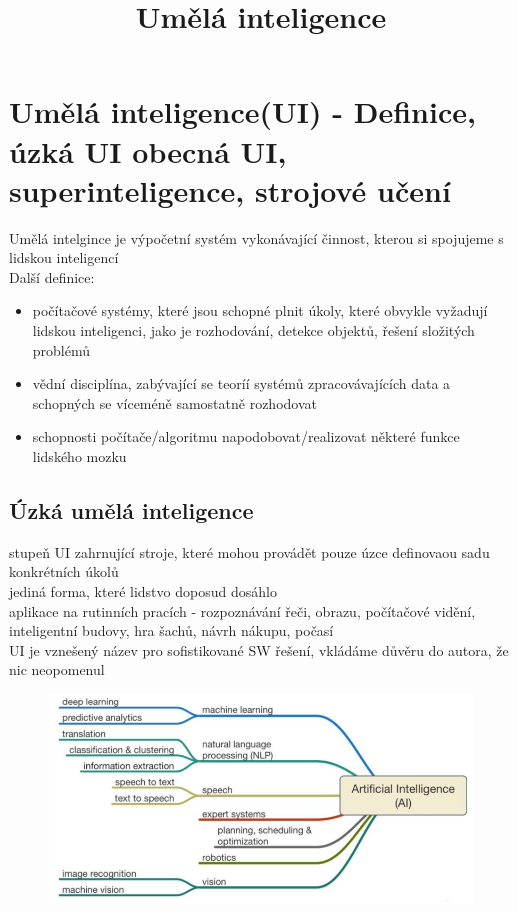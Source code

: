 \title{Umělá inteligence}

\section{Umělá inteligence(UI) - Definice, úzká UI obecná UI, superinteligence, strojové učení}
Umělá intelgince je výpočetní systém vykonávající činnost, kterou si spojujeme s lidskou inteligencí\\
Další definice:
\begin{itemize}
    \item počítačové systémy, které jsou schopné plnit úkoly, které obvykle vyžadují lidskou inteligenci, jako je rozhodování, detekce objektů, řešení složitých problémů
    \item vědní disciplína, zabývající se teoríí systémů zpracovávajících data a schopných se víceméně samostatně rozhodovat
    \item schopnosti počítače/algoritmu napodobovat/realizovat některé funkce lidského mozku
\end{itemize}
\subsection{Úzká umělá inteligence}
stupeň UI zahrnující stroje, které mohou provádět pouze úzce definovaou sadu konkrétních úkolů\\
jediná forma, které lidstvo doposud dosáhlo\\
aplikace na rutinních pracích - rozpoznávání řeči, obrazu, počítačové vidění, inteligentní budovy, hra šachů, návrh nákupu, počasí\\
UI je vznešený název pro sofistikované SW řešení, vkládáme důvěru do autora, že nic neopomenul\\
\begin{figure}[H]
    \includegraphics[scale = 1]{images/uzkeAI.png}
\end{figure}
